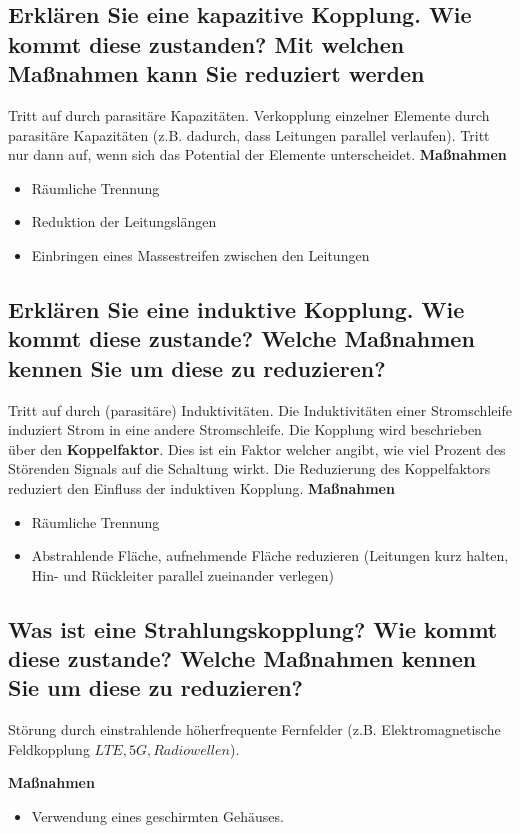 \subsection{Erklären Sie eine kapazitive Kopplung. Wie kommt diese zustanden? Mit welchen Maßnahmen kann Sie reduziert werden}
Tritt auf durch parasitäre Kapazitäten. Verkopplung einzelner Elemente durch parasitäre Kapazitäten (z.B. dadurch, dass Leitungen parallel verlaufen). Tritt nur dann auf, wenn sich das Potential der Elemente unterscheidet.\p
\textbf{Maßnahmen}
\begin{itemize}
  \item Räumliche Trennung
  \item Reduktion der Leitungslängen
  \item Einbringen eines Massestreifen zwischen den Leitungen
\end{itemize}

\subsection{Erklären Sie eine induktive Kopplung. Wie kommt diese zustande? Welche Maßnahmen kennen Sie um diese zu reduzieren?}
Tritt auf durch (parasitäre) Induktivitäten. Die Induktivitäten einer Stromschleife induziert Strom in eine andere Stromschleife.\p
Die Kopplung wird beschrieben über den \textbf{Koppelfaktor}. Dies ist ein Faktor welcher angibt, wie viel Prozent des Störenden Signals auf die Schaltung wirkt. Die Reduzierung des Koppelfaktors reduziert den Einfluss der induktiven Kopplung.\p
\textbf{Maßnahmen}
\begin{itemize}
  \item Räumliche Trennung
  \item Abstrahlende Fläche, aufnehmende Fläche reduzieren (Leitungen kurz halten, Hin- und Rückleiter parallel zueinander verlegen)
\end{itemize}

\subsection{Was ist eine Strahlungskopplung? Wie kommt diese zustande? Welche Maßnahmen kennen Sie um diese zu reduzieren?}
Störung durch einstrahlende höherfrequente Fernfelder (z.B. Elektromagnetische Feldkopplung \(LTE, 5G, Radiowellen\)).

\textbf{Maßnahmen}
\begin{itemize}
  \item Verwendung eines geschirmten Gehäuses.
\end{itemize}

